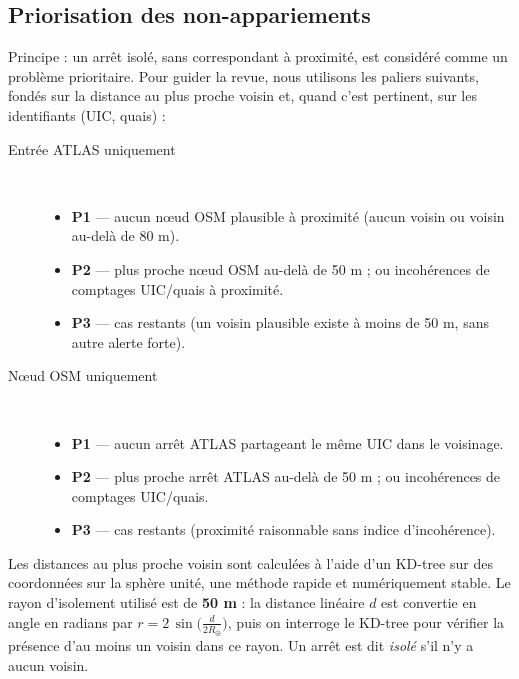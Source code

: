 \subsection{Priorisation des non-appariements}
Principe : un arrêt isolé, sans correspondant à proximité, est considéré comme un problème prioritaire. Pour guider la revue, nous utilisons les paliers suivants, fondés sur la distance au plus proche voisin et, quand c'est pertinent, sur les identifiants (UIC, quais) :
\begin{description}
  \item[Entrée ATLAS uniquement] \hfill\\
  \begin{itemize}
    \item \textbf{P1} — aucun nœud OSM plausible à proximité (aucun voisin ou voisin au-delà de 80 m).
    \item \textbf{P2} — plus proche nœud OSM au-delà de 50 m ; ou incohérences de comptages UIC/quais à proximité.
    \item \textbf{P3} — cas restants (un voisin plausible existe à moins de 50 m, sans autre alerte forte).
  \end{itemize}
  \item[Nœud OSM uniquement] \hfill\\
  \begin{itemize}
    \item \textbf{P1} — aucun arrêt ATLAS partageant le même UIC dans le voisinage.
    \item \textbf{P2} — plus proche arrêt ATLAS au-delà de 50 m ; ou incohérences de comptages UIC/quais.
    \item \textbf{P3} — cas restants (proximité raisonnable sans indice d'incohérence).
  \end{itemize}
\end{description}

\noindent Les distances au plus proche voisin sont calculées à l'aide d'un KD-tree sur des coordonnées sur la sphère unité, une méthode rapide et numériquement stable. Le rayon d'isolement utilisé est de \textbf{50 m} : la distance linéaire \(d\) est convertie en angle en radians par \(r = 2\,\sin\!\big(\frac{d}{2R_\oplus}\big)\), puis on interroge le KD-tree pour vérifier la présence d'au moins un voisin dans ce rayon. Un arrêt est dit \emph{isolé} s'il n'y a aucun voisin.

